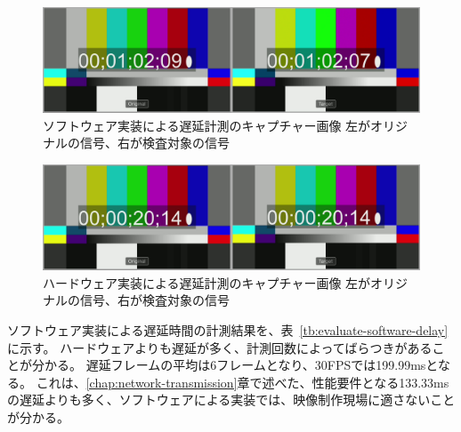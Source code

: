 \begin{figure}[htbp]
  \begin{center}
    \includegraphics[bb=0 0 1920 540,width=14cm]{img/evaluate-delay-software-2.png}
  \end{center}
  \caption[ソフトウェア実装による遅延計測のキャプチャー画像]{ソフトウェア実装による遅延計測のキャプチャー画像 左がオリジナルの信号、右が検査対象の信号}
  \label{fig:evaluate-delay-software-2}
\end{figure}

\begin{figure}[htbp]
  \begin{center}
    \includegraphics[bb=0 0 1920 540,width=14cm]{img/evaluate-delay-hardware.png}
  \end{center}
  \caption[ハードウェア実装による遅延計測のキャプチャー画像]{ハードウェア実装による遅延計測のキャプチャー画像 左がオリジナルの信号、右が検査対象の信号}
  \label{fig:evaluate-delay-hardware}
\end{figure}


ソフトウェア実装による遅延時間の計測結果を、表~\ref{tb:evaluate-software-delay}に示す。
ハードウェアよりも遅延が多く、計測回数によってばらつきがあることが分かる。
遅延フレームの平均は6フレームとなり、30FPSでは199.99msとなる。
これは、\ref{chap:network-transmission}章で述べた、性能要件となる133.33msの遅延よりも多く、ソフトウェアによる実装では、映像制作現場に適さないことが分かる。

